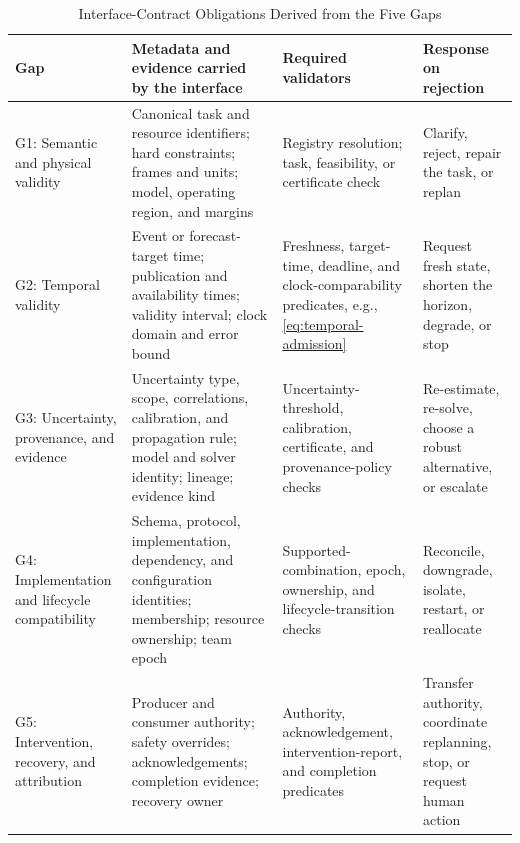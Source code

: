 \begin{table}[!t]
  \centering
  \caption{Interface-Contract Obligations Derived from the Five Gaps}
  \label{tab:obligations}
  \scriptsize
  \setlength{\tabcolsep}{3pt}
  \renewcommand{\arraystretch}{1.08}
  \begin{tabularx}{\textwidth}{@{}P{0.17\textwidth}P{0.33\textwidth}P{0.25\textwidth}Y@{}}
    \toprule
    Gap & Metadata and evidence carried by the interface & Required validators & Response on rejection \\
    \midrule
    G1: Semantic and physical validity
      & Canonical task and resource identifiers; hard constraints; frames and units; model, operating region, and margins
      & Registry resolution; task, feasibility, or certificate check
      & Clarify, reject, repair the task, or replan \\
    G2: Temporal validity
      & Event or forecast-target time; publication and availability times; validity interval; clock domain and error bound
      & Freshness, target-time, deadline, and clock-comparability predicates, e.g., \eqref{eq:temporal-admission}
      & Request fresh state, shorten the horizon, degrade, or stop \\
    G3: Uncertainty, provenance, and evidence
      & Uncertainty type, scope, correlations, calibration, and propagation rule; model and solver identity; lineage; evidence kind
      & Uncertainty-threshold, calibration, certificate, and provenance-policy checks
      & Re-estimate, re-solve, choose a robust alternative, or escalate \\
    G4: Implementation and lifecycle compatibility
      & Schema, protocol, implementation, dependency, and configuration identities; membership; resource ownership; team epoch
      & Supported-combination, epoch, ownership, and lifecycle-transition checks
      & Reconcile, downgrade, isolate, restart, or reallocate \\
    G5: Intervention, recovery, and attribution
      & Producer and consumer authority; safety overrides; acknowledgements; completion evidence; recovery owner
      & Authority, acknowledgement, intervention-report, and completion predicates
      & Transfer authority, coordinate replanning, stop, or request human action \\
    \bottomrule
  \end{tabularx}
\end{table}

